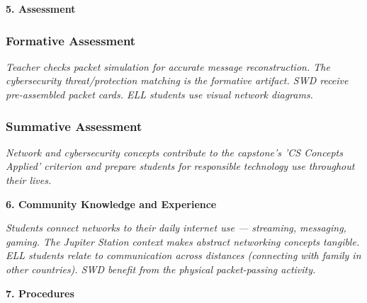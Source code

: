 \documentclass[11pt,letterpaper]{article}
\begin{document}
\newpage
\textbf{5. Assessment}

\subsubsection{Formative Assessment}

\textit{Teacher checks packet simulation for accurate message reconstruction. The cybersecurity threat/protection matching is the formative artifact. SWD receive pre-assembled packet cards. ELL students use visual network diagrams.}

\subsubsection{Summative Assessment}

\textit{Network and cybersecurity concepts contribute to the capstone's 'CS Concepts Applied' criterion and prepare students for responsible technology use throughout their lives.}

\textbf{6. Community Knowledge and Experience}

\textit{Students connect networks to their daily internet use --- streaming, messaging, gaming. The Jupiter Station context makes abstract networking concepts tangible. ELL students relate to communication across distances (connecting with family in other countries). SWD benefit from the physical packet-passing activity.}

\textbf{7. Procedures}
\end{document}
